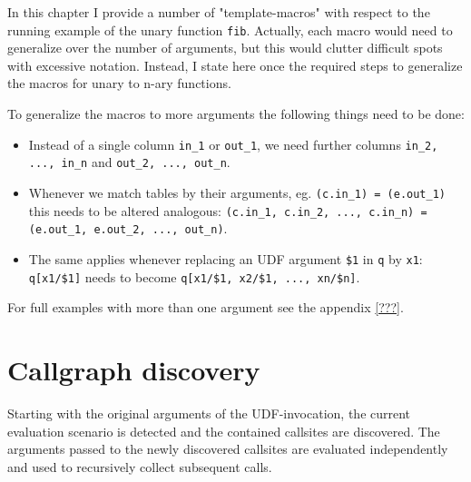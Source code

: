 In this chapter I provide a number of "template-macros" with respect to the running example of the unary function \texttt{fib}. Actually, each macro would need to generalize over the number of arguments, but this would clutter difficult spots with excessive notation. Instead, I state here once the required steps to generalize the macros for unary to n-ary functions.

To generalize the macros to more arguments the following things need to be done:
\begin{itemize}
    \item Instead of a single column \texttt{in\_1} or \texttt{out\_1}, we need further columns \texttt{in\_2, ..., in\_n} and \texttt{out\_2, ..., out\_n}.
    \item Whenever we match tables by their arguments, eg. \texttt{(c.in\_1) = (e.out\_1)} this needs to be altered analogous: \texttt{(c.in\_1, c.in\_2, ..., c.in\_n) = (e.out\_1, e.out\_2, ..., out\_n)}.
    \item The same applies whenever replacing an UDF argument \texttt{\$1} in \texttt{q} by \texttt{x1}: \texttt{q[x1/\$1]} needs to become \texttt{q[x1/\$1, x2/\$1, ..., xn/\$n]}.
\end{itemize}

For full examples with more than one argument see the appendix \autoref{???}. 

\section{Callgraph discovery}

Starting with the original arguments of the UDF-invocation, the current evaluation scenario is detected and the contained callsites are discovered. The arguments passed to the newly discovered callsites are evaluated independently and used to recursively collect subsequent calls.

